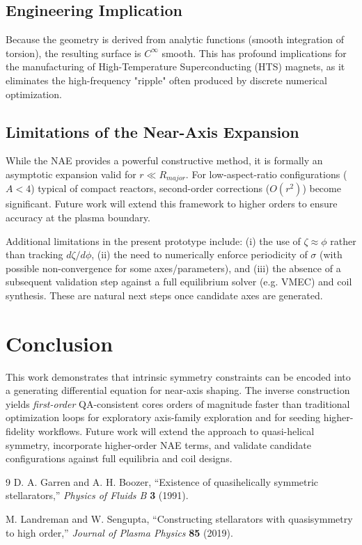 \documentclass{article}
\begin{document}
\subsection{Engineering Implication}

Because the geometry is derived from analytic functions (smooth integration of torsion), the resulting surface is $C^\infty$ smooth. This has profound implications for the manufacturing of High-Temperature Superconducting (HTS) magnets, as it eliminates the high-frequency "ripple" often produced by discrete numerical optimization.

\subsection{Limitations of the Near-Axis Expansion}

While the NAE provides a powerful constructive method, it is formally an asymptotic expansion valid for $r \ll R_{major}$. For low-aspect-ratio configurations ($A < 4$) typical of compact reactors, second-order corrections ($O(r^2)$) become significant. Future work will extend this framework to higher orders to ensure accuracy at the plasma boundary.

Additional limitations in the present prototype include: (i) the use of $\zeta\approx\phi$ rather than tracking $d\zeta/d\phi$, (ii) the need to numerically enforce periodicity of $\sigma$ (with possible non-convergence for some axes/parameters), and (iii) the absence of a subsequent validation step against a full equilibrium solver (e.g. VMEC) and coil synthesis. These are natural next steps once candidate axes are generated.

\section{Conclusion}

This work demonstrates that intrinsic symmetry constraints can be encoded into a generating differential equation for near-axis shaping. The inverse construction yields \emph{first-order} QA-consistent cores orders of magnitude faster than traditional optimization loops for exploratory axis-family exploration and for seeding higher-fidelity workflows. Future work will extend the approach to quasi-helical symmetry, incorporate higher-order NAE terms, and validate candidate configurations against full equilibria and coil designs.

\begin{thebibliography}{9}
D. A. Garren and A. H. Boozer, ``Existence of quasihelically symmetric stellarators,'' \emph{Physics of Fluids B} \textbf{3} (1991).

M. Landreman and W. Sengupta, ``Constructing stellarators with quasisymmetry to high order,'' \emph{Journal of Plasma Physics} \textbf{85} (2019).
\end{thebibliography}
\end{document}
